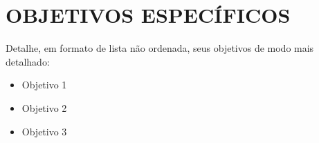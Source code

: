 \section{OBJETIVOS ESPECÍFICOS}
\label{sec:objetivos_especificos}
Detalhe, em formato de lista não ordenada, seus objetivos de modo mais detalhado:

\begin{itemize}
    \item Objetivo 1
    \item Objetivo 2
    \item Objetivo 3
\end{itemize}
